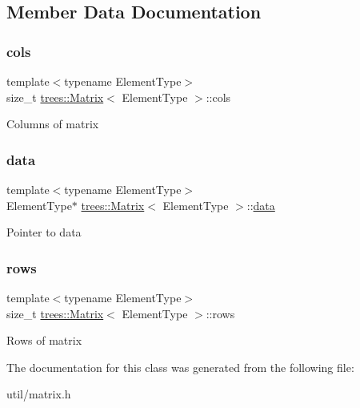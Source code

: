 \subsection{Member Data Documentation}
\mbox{\label{classtrees_1_1_matrix_a612011a0ae81b3e9d0a7e44a7e827f5c}} 
\subsubsection{\texorpdfstring{cols}{cols}}
{\footnotesize\ttfamily template$<$typename Element\+Type$>$ \\
size\+\_\+t \hyperlink{classtrees_1_1_matrix}{trees\+::\+Matrix}$<$ Element\+Type $>$\+::cols}

Columns of matrix \mbox{\label{classtrees_1_1_matrix_ac7cf0dc5123d2df5cfbac43c5b3c3ee6}} 
\subsubsection{\texorpdfstring{data}{data}}
{\footnotesize\ttfamily template$<$typename Element\+Type$>$ \\
Element\+Type$\ast$ \hyperlink{classtrees_1_1_matrix}{trees\+::\+Matrix}$<$ Element\+Type $>$\+::\hyperlink{structdata}{data}}

Pointer to data \mbox{\label{classtrees_1_1_matrix_a88dfff3f217f59caec11e519b23153f6}} 
\subsubsection{\texorpdfstring{rows}{rows}}
{\footnotesize\ttfamily template$<$typename Element\+Type$>$ \\
size\+\_\+t \hyperlink{classtrees_1_1_matrix}{trees\+::\+Matrix}$<$ Element\+Type $>$\+::rows}

Rows of matrix 

The documentation for this class was generated from the following file\+:\begin{DoxyCompactItemize}
\item 
util/matrix.\+h\end{DoxyCompactItemize}
